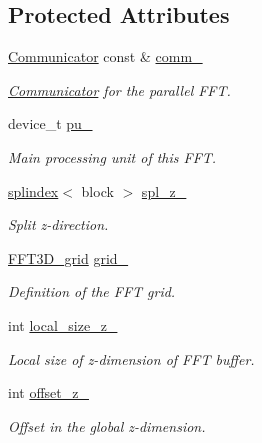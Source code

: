 \subsection*{Protected Attributes}
\begin{DoxyCompactItemize}
\item 
\hyperlink{classsddk_1_1_communicator}{Communicator} const \& \hyperlink{classsddk_1_1_f_f_t3_d_a1002c79cdd90213b476d9b768fb7a94a}{comm\+\_\+}
\begin{DoxyCompactList}\small\item\em \hyperlink{classsddk_1_1_communicator}{Communicator} for the parallel F\+F\+T. \end{DoxyCompactList}\item 
device\+\_\+t \hyperlink{classsddk_1_1_f_f_t3_d_abfb4de99fbcab38632fb4870200f1a66}{pu\+\_\+}
\begin{DoxyCompactList}\small\item\em Main processing unit of this F\+F\+T. \end{DoxyCompactList}\item 
\hyperlink{classsddk_1_1splindex}{splindex}$<$ block $>$ \hyperlink{classsddk_1_1_f_f_t3_d_a2b8697edcd2c0f1bf81129611c84088d}{spl\+\_\+z\+\_\+}
\begin{DoxyCompactList}\small\item\em Split z-\/direction. \end{DoxyCompactList}\item 
\hyperlink{classsddk_1_1_f_f_t3_d__grid}{F\+F\+T3\+D\+\_\+grid} \hyperlink{classsddk_1_1_f_f_t3_d_a27a753a25185a7cadbf0f036f5fb1c98}{grid\+\_\+}
\begin{DoxyCompactList}\small\item\em Definition of the F\+F\+T grid. \end{DoxyCompactList}\item 
int \hyperlink{classsddk_1_1_f_f_t3_d_a999766ae41a3fbe1d8c2643eba850ba6}{local\+\_\+size\+\_\+z\+\_\+}
\begin{DoxyCompactList}\small\item\em Local size of z-\/dimension of F\+F\+T buffer. \end{DoxyCompactList}\item 
int \hyperlink{classsddk_1_1_f_f_t3_d_a57e693bd91fbce44258bbcaa1a7991ea}{offset\+\_\+z\+\_\+}
\begin{DoxyCompactList}\small\item\em Offset in the global z-\/dimension. \end{DoxyCompactList}\item 

\end{DoxyCompactItemize}
